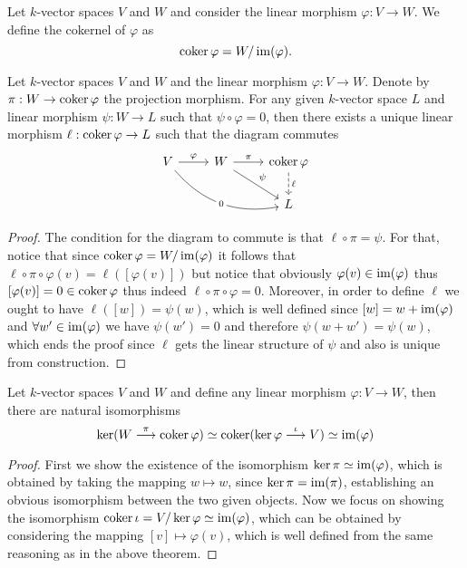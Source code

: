 \begin{definition}[Cokernel]
  Let \(k\)-vector spaces \(V\) and \(W\) and consider the linear morphism
  \(\varphi : V \to W\). We define the cokernel of \(\varphi\) as
  \[
    \operatorname{coker} \varphi = W/\operatorname{im}(\varphi).
  \]
\end{definition}

\begin{theorem}
   Let \(k\)-vector spaces \(V\) and \(W\) and the linear morphism \(\varphi : V
   \to W\). Denote by \(\pi : W \to \operatorname{coker} \varphi\) the projection morphism.
   For any given \(k\)-vector space \(L\) and linear morphism \(\psi : W \to L\)
   such that  \(\psi \circ \varphi = 0\), then there exists a unique linear
   morphism  \(\ell : \operatorname{coker} \varphi \to L\) such that the diagram commutes
   \[
     \begin{tikzcd}
       V \ar[drr, bend right, "0" description] \ar[r, "\varphi"] &W \ar[r,
       "\pi"] \ar[dr, "\psi"] &\coker \varphi \ar[d, dashed, "\ell"]
       \\
        & &L
     \end{tikzcd}
   \]
\end{theorem}

\begin{proof}
  The condition for the diagram to commute is that \(\ell \circ \pi = \psi\).
  For that, notice that since \(\operatorname{coker} \varphi = W/\operatorname{im}(\varphi)\) it follows
  that \(\ell \circ \pi \circ \varphi (v) = \ell([\varphi(v)])\) but notice that
  obviously \(\varphi(v) \in \operatorname{im}(\varphi)\) thus \([\varphi(v)] = 0 \in \operatorname{coker}
  \varphi\) thus indeed \(\ell \circ \pi \circ \varphi = 0\). Moreover, in order
  to define \(\ell\) we ought to have \(\ell([w]) = \psi(w)\), which is well
  defined since \([w] = w + \operatorname{im}(\varphi)\) and \(\forall w' \in \operatorname{im}(\varphi)\)
  we have \(\psi(w') = 0\) and therefore \(\psi(w + w') = \psi(w)\), which ends
  the proof since \(\ell\) gets the linear structure of \(\psi\) and also is
  unique from construction.
\end{proof}

\begin{proposition}
  Let \(k\)-vector spaces \(V\) and \(W\) and define any linear morphism
  \(\varphi : V \to W\), then there are natural isomorphisms
  \[
    \ker(W \overset \pi \longrightarrow \operatorname{coker} \varphi) \simeq \operatorname{coker}(\ker \varphi
    \overset \iota \longrightarrow V) \simeq \operatorname{im}(\varphi)
  \]
\end{proposition}

\begin{proof}
  First we show the existence of the isomorphism \(\ker \pi \simeq \operatorname{im}(\varphi)\),
  which is obtained by taking the mapping \(w \mapsto w\), since \(\ker \pi =
  \operatorname{im}(\pi)\), establishing an obvious isomorphism between the two given objects.
  Now we focus on showing the isomorphism \(\operatorname{coker} \iota = V/\ker \varphi \simeq
  \operatorname{im}(\varphi)\), which can be obtained by considering the mapping \([v] \mapsto
  \varphi(v)\), which is well defined from the same reasoning as in the above
  theorem.
\end{proof}

